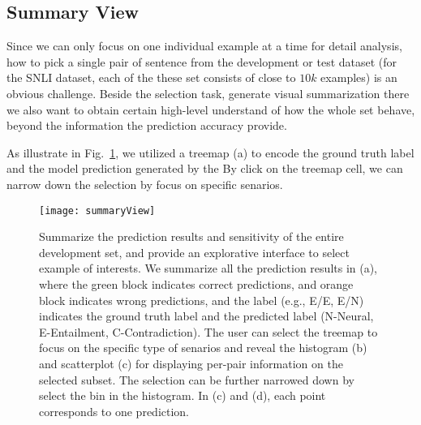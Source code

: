 \subsection{Summary View}
\label{sec:allPairs}
Since we can only focus on one individual example at a time for detail analysis, how to pick a single pair of sentence from the development or test dataset (for the SNLI dataset, each of the these set consists of close to $10k$ examples) is an obvious challenge.
%
Beside the selection task, generate visual summarization there we also want to obtain certain high-level understand of how the whole set behave, beyond the information the prediction accuracy provide.

As illustrate in Fig.~\ref{fig:summaryView}, we utilized a treemap (a) to encode the ground truth label and the model prediction generated by the
By click on the treemap cell, we can narrow down the selection by focus on specific senarios.


\begin{figure}[htbp]
\centering
\vspace{-2mm}
 \texttt{[image: summaryView]}
 \caption{
Summarize the prediction results and sensitivity of the entire development set, and provide an explorative interface to select example of interests.
We summarize all the prediction results in (a), where the green block indicates correct predictions, and orange block indicates wrong predictions, and the label (e.g., E/E, E/N) indicates the ground truth label and the predicted label (N-Neural, E-Entailment, C-Contradiction).
%
The user can select the treemap to focus on the specific type of senarios and reveal the histogram (b) and scatterplot (c) for displaying per-pair information on the selected subset.
The selection can be further narrowed down by select the bin in the histogram.
In (c) and (d), each point corresponds to one prediction.
 }
\label{fig:summaryView}
\end{figure}

